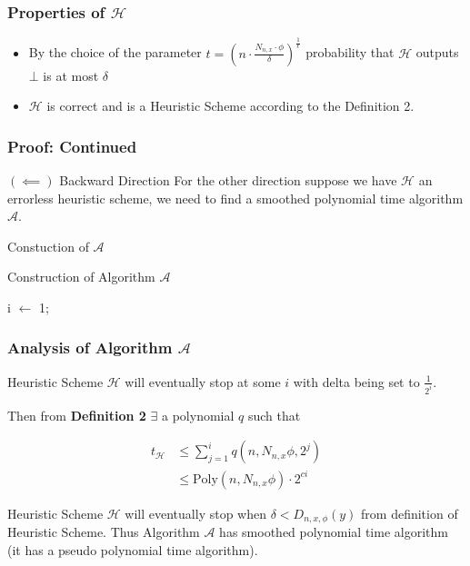 \begin{frame}
    \frametitle{Properties of $\mathcal{H}$}

    \begin{itemize}
        \item By the choice of the parameter $t = (n \cdot \frac{N_{n, x} \cdot
                      \phi}{\delta}) ^{\frac{1}{\epsilon}}$ probability that $\mathcal{H}$ outputs
              $\bot$ is at most $\delta$
        \item $\mathcal{H}$ is correct and is a Heuristic Scheme according to the Definition 2.
    \end{itemize}

\end{frame}

\begin{frame}
    \frametitle{Proof: Continued}

    $(\impliedby)$ Backward Direction
    For the other direction suppose we have $\mathcal{H}$ an errorless heuristic scheme, we need to find a smoothed polynomial time
    algorithm $\mathcal{A}$.

    \vspace{2em}

    Constuction of $\mathcal{A}$

    \begin{algorithm}[H]
        \caption{Construction of Algorithm $\mathcal{A}$}
        i $\gets$ 1;\\
    \end{algorithm}

\end{frame}

\begin{frame}
    \frametitle{Analysis of Algorithm {$\mathcal{A}$}}

    Heuristic Scheme $\mathcal{H}$ will eventually stop at some $i$ with delta
    being set to $\frac{1}{2^i}$.

    Then from \textbf{Definition 2} $\exists$ a polynomial $q$ such that

    \begin{align*}
        t_{\mathcal{H}} & \leq \displaystyle\sum_{j = 1}^{i} q(n, N_{n,x} \phi, 2^j) \\
                        & \leq \text{Poly}(n, N_{n,x} \phi) \cdot 2^{ci}
    \end{align*}

    Heuristic Scheme $\mathcal{H}$ will eventually stop when $\delta <
        D_{n,x,\phi}(y)$ from definition of Heuristic Scheme. Thus Algorithm
    $\mathcal{A}$ has smoothed polynomial time algorithm (it has a pseudo
    polynomial time algorithm).
\end{frame}

